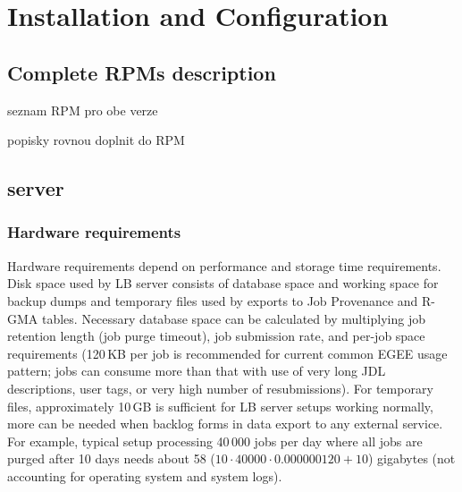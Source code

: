 \section{Installation and Configuration}

\subsection{Complete RPMs description}


seznam RPM pro obe verze

popisky rovnou doplnit do RPM

\subsection{\LB server}

\subsubsection{Hardware requirements}
\label{inst:hw_req}

Hardware requirements depend on performance and storage time requirements.
Disk space used by LB server consists of database space and working space 
for backup dumps and temporary files used by exports to Job Provenance and
R-GMA tables. Necessary database space can be calculated by multiplying 
job retention length (job purge timeout), job submission rate, and  
per-job space requirements (120\,KB per job is recommended for current common 
EGEE usage pattern; jobs can consume more than that with use of very long
JDL descriptions, user tags, or very high number of resubmissions).
For temporary files, approximately 10\,GB is sufficient for LB server setups
working normally, more can be needed when backlog forms in data export
to any external service. For example, typical setup processing 40\,000 jobs per 
day where all jobs are purged after 10 days needs about 58
($10 \cdot 40000 \cdot 0.000000120 + 10$) gigabytes (not accounting for operating 
system and system logs).

